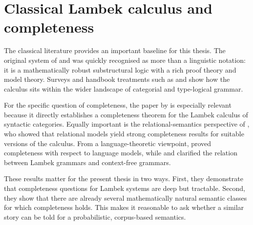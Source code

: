 \section{Classical Lambek calculus and completeness}
The classical literature provides an important baseline for this thesis. The original system of
\citet{Lambek1958} and \citet{Lambek1961} was quickly recognised as more than a linguistic
notation: it is a mathematically robust substructural logic with a rich proof theory and model
theory. Surveys and handbook treatments such as \citet{vanBenthem1988} and
\citet{Moortgat1997} show how the calculus sits within the wider landscape of categorial and
type-logical grammar.

For the specific question of completeness, the paper by \citet{Dosen1985} is especially relevant
because it directly establishes a completeness theorem for the Lambek calculus of syntactic
categories. Equally important is the relational-semantics perspective of
\citet{AndrekaMikulas1994}, who showed that relational models yield strong completeness results
for suitable versions of the calculus. From a language-theoretic viewpoint, \citet{Pentus1995}
proved completeness with respect to language models, while \citet{Pentus1993} and
\citet{Pentus1997} clarified the relation between Lambek grammars and context-free grammars.

These results matter for the present thesis in two ways. First, they demonstrate that
completeness questions for Lambek systems are deep but tractable. Second, they show that
there are already several mathematically natural semantic classes for which completeness holds.
This makes it reasonable to ask whether a similar story can be told for a probabilistic,
corpus-based semantics.

